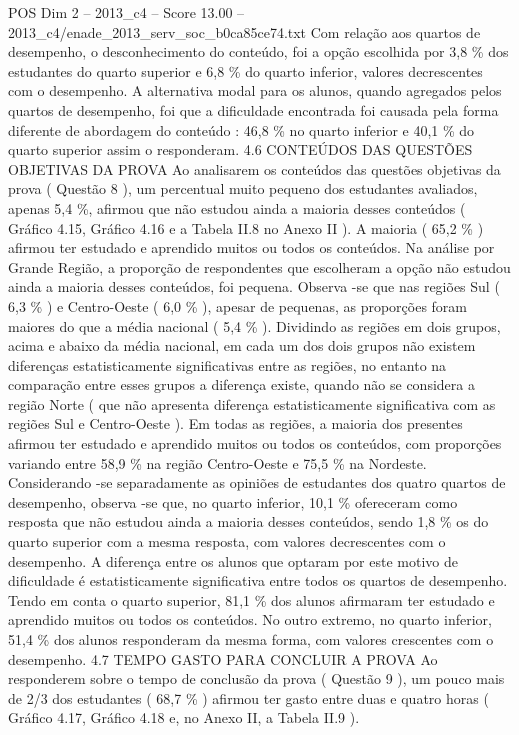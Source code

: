 \begin{textsample}{POS Dim 2 – 2013\_c4 – Score 13.00 – 2013\_c4/enade\_2013\_serv\_soc\_b0ca85ce74.txt}
Com relação aos quartos de desempenho, o desconhecimento do conteúdo, foi a opção escolhida por 3,8 \% dos estudantes do quarto superior e 6,8 \% do quarto inferior, valores decrescentes com o desempenho.
A alternativa modal para os alunos, quando agregados pelos quartos de desempenho, foi que a dificuldade encontrada foi causada pela forma diferente de abordagem do conteúdo : 46,8 \% no quarto inferior e 40,1 \% do quarto superior assim o responderam. 4.6 CONTEÚDOS DAS QUESTÕES OBJETIVAS DA PROVA Ao analisarem os conteúdos das questões objetivas da prova ( Questão 8 ), um percentual muito pequeno dos estudantes avaliados, apenas 5,4 \%, afirmou que não estudou ainda a maioria desses conteúdos ( Gráfico 4.15, Gráfico 4.16 e a Tabela II.8 no Anexo II ).
A maioria ( 65,2 \% ) afirmou ter estudado e aprendido muitos ou todos os conteúdos.
Na análise por Grande Região, a proporção de respondentes que escolheram a opção não estudou ainda a maioria desses conteúdos, foi pequena.
Observa -se que nas regiões Sul ( 6,3 \% ) e Centro-Oeste ( 6,0 \% ), apesar de pequenas, as proporções foram maiores do que a média nacional ( 5,4 \% ).
Dividindo as regiões em dois grupos, acima e abaixo da média nacional, em cada um dos dois grupos não existem diferenças estatisticamente significativas entre as regiões, no entanto na comparação entre esses grupos a diferença existe, quando não se considera a região Norte ( que não apresenta diferença estatisticamente significativa com as regiões Sul e Centro-Oeste ).
Em todas as regiões, a maioria dos presentes afirmou ter estudado e aprendido muitos ou todos os conteúdos, com proporções variando entre 58,9 \% na região Centro-Oeste e 75,5 \% na Nordeste.
Considerando -se separadamente as opiniões de estudantes dos quatro quartos de desempenho, observa -se que, no quarto inferior, 10,1 \% ofereceram como resposta que não estudou ainda a maioria desses conteúdos, sendo 1,8 \% os do quarto superior com a mesma resposta, com valores decrescentes com o desempenho.
A diferença entre os alunos que optaram por este motivo de dificuldade é estatisticamente significativa entre todos os quartos de desempenho.
Tendo em conta o quarto superior, 81,1 \% dos alunos afirmaram ter estudado e aprendido muitos ou todos os conteúdos.
No outro extremo, no quarto inferior, 51,4 \% dos alunos responderam da mesma forma, com valores crescentes com o desempenho. 4.7 TEMPO GASTO PARA CONCLUIR A PROVA Ao responderem sobre o tempo de conclusão da prova ( Questão 9 ), um pouco mais de 2/3 dos estudantes ( 68,7 \% ) afirmou ter gasto entre duas e quatro horas ( Gráfico 4.17, Gráfico 4.18 e, no Anexo II, a Tabela II.9 ).

\end{textsample}
